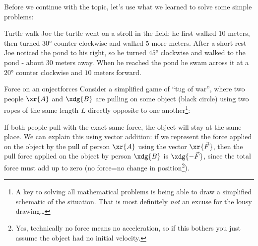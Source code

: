 
Before we continue with the topic, let's use what we learned to solve some simple problems:

\begin{example}{Turtle walk}{}
  Joe the turtle went on a stroll in the field: he first walked $10$ meters, then turned $\ang{30}$ counter clockwise and walked $5$ more meters. After a short rest Joe noticed the pond to his right, so he turned $\ang{45}$ clockwise and walked to the pond - about $30$ meters away. When he reached the pond he swam across it at a $\ang{20}$ counter clockwise and $10$ meters forward.
\end{example}

\begin{example}{Force on an onject}{forces}
  Consider a simplified game of ``tug of war'', where two people $\xr{A}$ and $\xdg{B}$ are pulling on some object (black circle) using two ropes of the same length $L$ directly opposite to one another\footnote{A key to solving all mathematical problems is being able to draw a simplified schematic of the situation. That is most definitely \textit{not} an excuse for the lousy drawing\dots}:

  \vspace{1em}
  \begin{center}
  \end{center}

  If both people pull with the exact same force, the object will stay at the same place. We can explain this using vector addition: if we represent the force applied on the object by the pull of person $\xr{A}$ using the vector $\xr{\vec{F}}$, then the pull force applied on the object by person $\xdg{B}$ is $\xdg{-\vec{F}}$, since the total force must add up to zero (no force=no change in position\footnote{Yes, technically no force means no acceleration, so if this bothers you just assume the object had no initial velocity.}).


\end{example}
